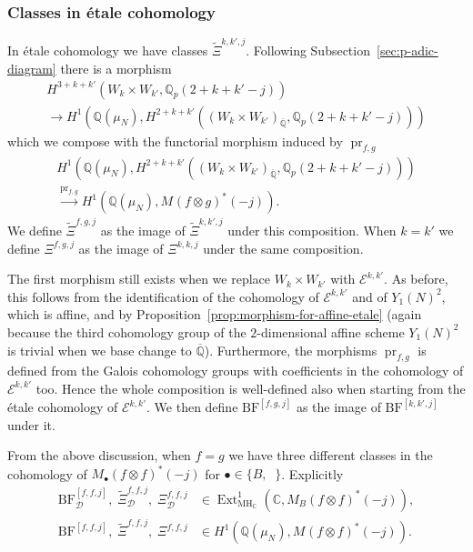 \documentclass[11pt, a4paper, reqno]{amsart}
\theoremstyle{definition}
\theoremstyle{plain}
\theoremstyle{remark}
\DeclareMathOperator{\Ext}{Ext}
\DeclareMathOperator{\et}{\acute{e}t}
\DeclareMathOperator{\pr}{pr}
\newcommand{\numberset}{\mathbb}
\newcommand{\C}{\numberset{C}}
\newcommand{\Q}{\numberset{Q}}
\newcommand{\Ell}{\mathcal{E}}
\newcommand{\BF}{\mathrm{BF}}
\newcommand{\lcBF}{\widetilde{\Xi}}
\newcommand{\cBF}{\Xi}
\newcommand{\MH}{\mathrm{MH}}
\newcommand{\del}{\mathcal{D}}
\begin{document}
\subsubsection{Classes in étale cohomology}
In étale cohomology we have classes $\lcBF^{k,k',j}_{\et}$. Following Subsection~\ref{sec:p-adic-diagram} there is a morphism
\begin{multline*}
    H^{3+k+k'}_{\et}(W_k \times W_{k'}, \Q_p(2+k+k'-j)) \\
    \to H^1(\Q(\mu_N),H^{2+k+k'}_{\et}((W_k\times W_{k'})_{\overline{\Q}},\Q_p(2+k+k'-j)))
\end{multline*}
which we compose with the functorial morphism induced by $\pr_{f,g}$
\begin{multline*}
    H^1(\Q(\mu_N),H^{2+k+k'}_{\et}((W_k\times W_{k'})_{\overline{\Q}},\Q_p(2+k+k'-j))) \\
    \xrightarrow{\pr_{f,g}} H^1(\Q(\mu_N),M_{\et}(f\otimes g)^*(-j)).
\end{multline*}
We define $\lcBF^{f,g,j}_{\et}$ as the image of $\lcBF^{k,k',j}_{\et}$ under this composition. When $k=k'$ we define $\cBF^{f,g,j}_{\et}$ as the image of $\cBF^{k,k,j}_{\et}$ under the same composition.

The first morphism still exists when we replace $W_k\times W_{k'}$ with $\Ell^{k,k'}$. As before, this follows from the identification of the cohomology of $\Ell^{k,k'}$ and of $Y_1(N)^2$, which is affine, and by Proposition~\ref{prop:morphism-for-affine-etale} (again because the third cohomology group of the $2$-dimensional affine scheme $Y_1(N)^2$ is trivial when we base change to $\overline{\Q}$). Furthermore, the morphisms $\pr_{f,g}$ is defined from the Galois cohomology groups with coefficients in the cohomology of $\Ell^{k,k'}$ too. Hence the whole composition is well-defined also when starting from the étale cohomology of $\Ell^{k,k'}$. We then define $\BF^{[f,g,j]}_{\et}$ as the image of $\BF^{[k,k',j]}_{\et}$ under it.

From the above discussion, when $f=g$ we have three different classes in the cohomology of $M_{\bullet}(f\otimes f)^*(-j)$ for $\bullet\in\{B,\et\}$. Explicitly
\begin{align*}
    \BF^{[f,f,j]}_{\del},\; \lcBF^{f,f,j}_{\del},\; \cBF^{f,f,j}_{\del} &\in \Ext^1_{\MH_\C}(\C, M_B(f\otimes f)^*(-j)), \\
    \BF^{[f,f,j]}_{\et},\; \lcBF^{f,f,j}_{\et},\; \cBF^{f,f,j}_{\et} &\in H^1(\Q(\mu_N),M_{\et}(f\otimes f)^*(-j)).
\end{align*}
\end{document}
